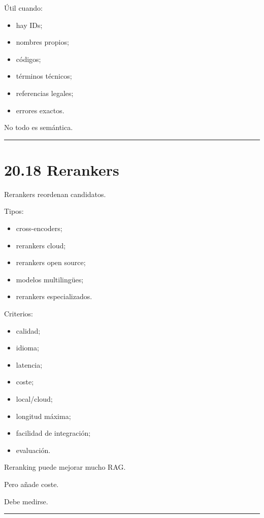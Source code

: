 Útil cuando:

\begin{itemize}
\tightlist
\item
  hay IDs;
\item
  nombres propios;
\item
  códigos;
\item
  términos técnicos;
\item
  referencias legales;
\item
  errores exactos.
\end{itemize}

No todo es semántica.

\begin{center}\rule{0.5\linewidth}{0.5pt}\end{center}

\section{20.18 Rerankers}\label{rerankers}

Rerankers reordenan candidatos.

Tipos:

\begin{itemize}
\tightlist
\item
  cross-encoders;
\item
  rerankers cloud;
\item
  rerankers open source;
\item
  modelos multilingües;
\item
  rerankers especializados.
\end{itemize}

Criterios:

\begin{itemize}
\tightlist
\item
  calidad;
\item
  idioma;
\item
  latencia;
\item
  coste;
\item
  local/cloud;
\item
  longitud máxima;
\item
  facilidad de integración;
\item
  evaluación.
\end{itemize}

Reranking puede mejorar mucho RAG.

Pero añade coste.

Debe medirse.

\begin{center}\rule{0.5\linewidth}{0.5pt}\end{center}

